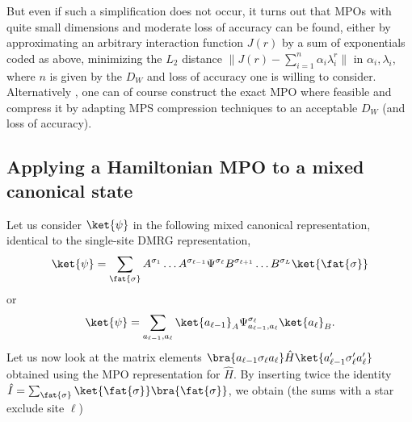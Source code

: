 But even if such a simplification does not occur, it turns out that MPOs with quite small dimensions and moderate loss of accuracy can be found, either by approximating an arbitrary interaction function $J(r)$ by a sum of exponentials coded as above\cite{VerstraetePirvu08,Crosswhite08a}, minimizing the $L_2$ distance $\| J(r) - \sum_{i=1}^n \alpha_i \lambda_i^r \|$ in $\alpha_i, \lambda_i$, where $n$ is given by the $D_W$ and loss of accuracy one is willing to consider. Alternatively \cite{Frowis10}, one can of course construct the exact MPO where feasible and compress it by adapting MPS compression techniques to an acceptable $D_W$ (and loss of accuracy). 

\subsection{Applying a Hamiltonian MPO to a mixed canonical state}
\label{subsec:Hamiltonianmixedcanonical}
Let us consider $\ket{\psi}$ in the following mixed canonical representation, identical to the single-site DMRG representation,
\begin{equation}
\ket{\psi} = \sum_{\fat{\sigma}} A^{\sigma_1} \ldots A^{\sigma_{\ell-1}} \Psi^{\sigma_{\ell}} B^{\sigma_{\ell+1}} \ldots B^{\sigma_L} \ket{\fat{\sigma}} 
\end{equation}
or 
\begin{equation}
\ket{\psi} = \sum_{a_{\ell-1},a_{\ell}} \ket{a_{\ell-1}}_A \Psi^{\sigma_{\ell}}_{a_{\ell-1}, a_{\ell}} \ket{a_{\ell}}_B .
\end{equation}
Let us now look at the matrix elements $\bra{a_{\ell-1} \sigma_{\ell} a_{\ell}} \hat{H}  \ket{a'_{\ell-1} \sigma'_{\ell} a'_{\ell}}$ obtained using the MPO representation for $\hat{H}$. By inserting twice the identity $\hat{I} = \sum_{\fat{\sigma}} \ket{\fat{\sigma}}\bra{\fat{\sigma}}$, we obtain (the sums with a star exclude site $\ell$)
